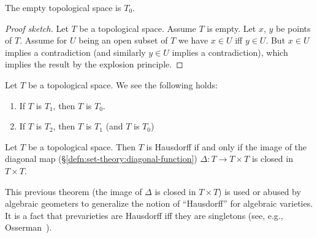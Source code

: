 \begin{example}
The empty topological space is $T_{0}$.

\begin{proof}[Proof sketch]
Let $T$ be a topological space. Assume $T$ is empty.
Let $x$, $y$ be points of $T$. Assume for $U$ being an open subset of
$T$ we have $x\in U$ iff $y\in U$.
But $x\in U$ implies a contradiction (and similarly $y\in U$ implies a
contradiction), which implies the result by the explosion principle.
\end{proof}
\end{example}

\begin{theorem}
Let $T$ be a topological space. We see the following holds:
\begin{enumerate}
\item If $T$ is $T_{1}$, then $T$ is $T_{0}$.
\item If $T$ is $T_{2}$, then $T$ is $T_{1}$ (and $T$ is $T_{0}$)
\end{enumerate}
\end{theorem}

\begin{theorem}
Let $T$ be a topological space.
Then $T$ is Hausdorff if and only if the image of the diagonal map (\S\ref{defn:set-theory:diagonal-function}) $\Delta\colon T\to T\times T$
is closed in $T\times T$.
\end{theorem}

\begin{remark}
This previous theorem (the image of $\Delta$ is closed in $T\times T$)
is used or abused by algebraic geometers to generalize the notion of
``Hausdorff'' for algebraic varieties. It is a fact that prevarieties
are Hausdorff iff they are singletons (see, e.g.,
Osserman~\cite[ch.5]{osserman2021concise}). 
\end{remark}